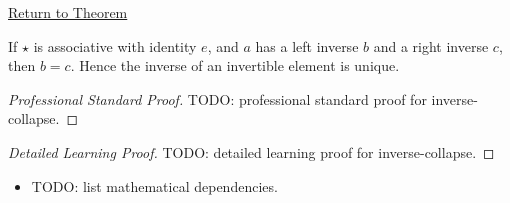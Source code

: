 \newpage
{}
\label{prf:inverse-collapse}

\begin{remark*}[Return]
\hyperref[prop:inverse-collapse]{Return to Theorem}
\end{remark*}

\begin{proposition*}
If $\star$ is associative with identity $e$, and $a$ has a left inverse $b$
and a right inverse $c$, then $b=c$. Hence the inverse of an invertible
element is unique.
\end{proposition*}

\begin{proof}[Professional Standard Proof]
\LRAProofBodyStart
TODO: professional standard proof for inverse-collapse.
\end{proof}

\begin{proof}[Detailed Learning Proof]
\LRAProofBodyStart
TODO: detailed learning proof for inverse-collapse.
\end{proof}

\begin{remark*}
\end{remark*}

\begin{dependencies}
\begin{itemize}
  \item TODO: list mathematical dependencies.
\end{itemize}
\end{dependencies}

\clearpage
